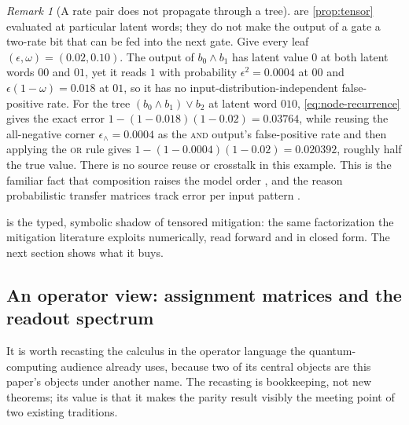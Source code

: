 \documentclass[11pt]{article}
\numberwithin{equation}{section}
\theoremstyle{plain}
\theoremstyle{definition}
\theoremstyle{remark}
\newtheorem{remark}[theorem]{Remark}
\newcommand{\eps}{\epsilon}
\begin{document}
\begin{remark}[A rate pair does not propagate through a tree]
\label{rem:no-pair}
 are \cref{prop:tensor} evaluated at particular
latent words; they do not make the output of a gate a two-rate bit that can be
fed into the next gate. Give every leaf $(\eps,\omega)=(0.02,0.10)$. The output
of $b_0\wedge b_1$ has latent value $0$ at both latent words $00$ and $01$, yet
it reads $1$ with probability $\eps^2=0.0004$ at $00$ and
$\eps(1-\omega)=0.018$ at $01$, so it has no input-distribution-independent
false-positive rate. For the tree $(b_0\wedge b_1)\vee b_2$ at latent word
$010$, \cref{eq:node-recurrence} gives the exact error
$1-(1-0.018)(1-0.02)=0.03764$, while reusing the all-negative corner
$\eps_\wedge=0.0004$ as the \textsc{and} output's false-positive rate and then
applying the \textsc{or} rule gives $1-(1-0.0004)(1-0.02)=0.020392$, roughly
half the true value. There is no source reuse or crosstalk in this example.
This is the familiar fact that composition raises the model order
\citep{bernoulliComposition}, and the reason probabilistic transfer matrices
track error per input pattern \citep{krishnaswamy2008ptm}.
\end{remark}

 is the typed, symbolic shadow of tensored mitigation: the same
factorization the mitigation literature exploits numerically, read forward and in
closed form. The next section shows what it buys.

\subsection{An operator view: assignment matrices and the readout spectrum}
\label{sec:operator}

It is worth recasting the calculus in the operator language the
quantum-computing audience already uses, because two of its central objects are
this paper's objects under another name. The recasting is bookkeeping, not new
theorems; its value is that it makes the parity result visibly the meeting point
of two existing traditions.
\end{document}
